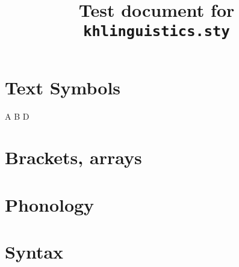 \documentclass{khplain}
\title{Test document for \texttt{khlinguistics.sty}}
\begin{document}
\maketitle

\section{Text Symbols}

\begin{examplebox}
\larrow \rarrow \lrarrow \par
\emptystr \zero \par
\cmark \xmark \par
A B \gap D \par
\end{examplebox}


\section{Brackets, arrays}

\begin{examplebox}
 \par
{} \par
{} \par
{} \par
{} \par
{} \par
\end{examplebox}

\begin{examplebox}
\end{examplebox}

\begin{examplebox}
\end{examplebox}


\section{Phonology}

\begin{examplebox}
 \par
{}
\end{examplebox}


\section{Syntax}
\end{document}
